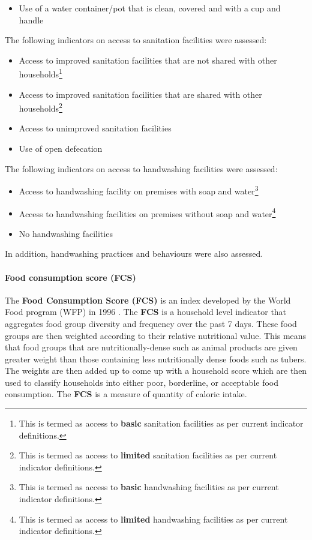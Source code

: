 \documentclass[12pt,a4paper]{article}
\providecommand{\tightlist}{%
  \setlength{\itemsep}{0pt}\setlength{\parskip}{0pt}}
\let\oldparagraph\paragraph
\renewcommand{\paragraph}[1]{\oldparagraph{#1}\mbox{}}
\let\rmarkdownfootnote\footnote%
\def\footnote{\protect\rmarkdownfootnote}
\begin{document}
\begin{itemize}
\tightlist
\item
  Use of a water container/pot that is clean, covered and with a cup and handle
\end{itemize}

The following indicators on access to sanitation facilities were assessed:

\begin{itemize}
\item
  Access to improved sanitation facilities that are not shared with other households\footnote{This is termed as access to \textbf{basic} sanitation facilities as per current indicator definitions.}
\item
  Access to improved sanitation facilities that are shared with other households\footnote{This is termed as access to \textbf{limited} sanitation facilities as per current indicator definitions.}
\item
  Access to unimproved sanitation facilities
\item
  Use of open defecation
\end{itemize}

The following indicators on access to handwashing facilities were assessed:

\begin{itemize}
\item
  Access to handwashing facility on premises with soap and water\footnote{This is termed as access to \textbf{basic} handwashing facilities as per current indicator definitions.}
\item
  Access to handwashing facilities on premises without soap and water\footnote{This is termed as access to \textbf{limited} handwashing facilities as per current indicator definitions.}
\item
  No handwashing facilities
\end{itemize}

In addition, handwashing practices and behaviours were also assessed.

\hypertarget{fcs}{%
\paragraph{Food consumption score (FCS)}\label{fcs}}

The \textbf{Food Consumption Score (FCS)} is an index developed by the World Food program (WFP) in 1996 \citep{VulnerabilityAssessmentandMappingWorldFoodProgramme:2008ti}. The \textbf{FCS} is a household level indicator that aggregates food group diversity and frequency over the past 7 days. These food groups are then weighted according to their relative nutritional value. This means that food groups that are nutritionally-dense such as animal products are given greater weight than those containing less nutritionally dense foods such as tubers. The weights are then added up to come up with a household score which are then used to classify households into either poor, borderline, or acceptable food consumption. The \textbf{FCS} is a measure of quantity of caloric intake.
\end{document}
